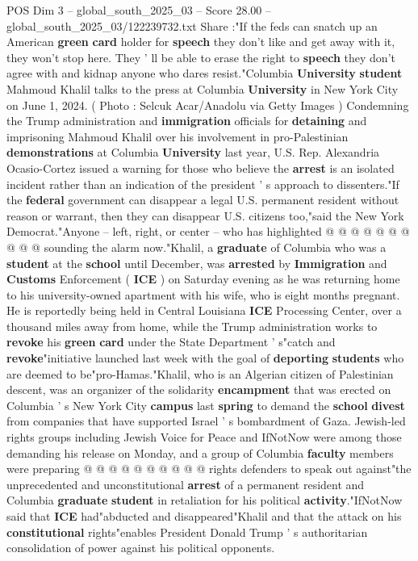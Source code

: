 \begin{textsample}{POS Dim 3 – global\_south\_2025\_03 – Score 28.00 – global\_south\_2025\_03/122239732.txt}  \label{ex:f3_pos_038}
Share :"If the feds can snatch up an American \textbf{green} \textbf{card} holder for \textbf{speech} they don't like and get away with it, they won't stop here.
They ' ll be able to erase the right to \textbf{speech} they don't agree with and kidnap anyone who dares resist."Columbia \textbf{University} \textbf{student} Mahmoud Khalil talks to the press at Columbia \textbf{University} in New York City on June 1, 2024. ( Photo : Selcuk Acar/Anadolu via Getty Images ) Condemning the Trump administration and \textbf{immigration} officials for \textbf{detaining} and imprisoning Mahmoud Khalil over his involvement in pro-Palestinian \textbf{demonstrations} at Columbia \textbf{University} last year, U.S.
Rep.
Alexandria Ocasio-Cortez issued a warning for those who believe the \textbf{arrest} is an isolated incident rather than an indication of the president ' s approach to dissenters."If the \textbf{federal} government can disappear a legal U.S. permanent resident without reason or warrant, then they can disappear U.S. citizens too,"said the New York Democrat."Anyone -- left, right, or center -- who has highlighted @ @ @ @ @ @ @ @ @ @ sounding the alarm now."Khalil, a \textbf{graduate} of Columbia who was a \textbf{student} at the \textbf{school} until December, was \textbf{arrested} by \textbf{Immigration} and \textbf{Customs} Enforcement ( \textbf{ICE} ) on Saturday evening as he was returning home to his university-owned apartment with his wife, who is eight months pregnant.
He is reportedly being held in Central Louisiana \textbf{ICE} Processing Center, over a thousand miles away from home, while the Trump administration works to \textbf{revoke} his \textbf{green} \textbf{card} under the State Department ' s"catch and \textbf{revoke}"initiative launched last week with the goal of \textbf{deporting} \textbf{students} who are deemed to be"pro-Hamas."Khalil, who is an Algerian citizen of Palestinian descent, was an organizer of the solidarity \textbf{encampment} that was erected on Columbia ' s New York City \textbf{campus} last \textbf{spring} to demand the \textbf{school} \textbf{divest} from companies that have supported Israel ' s bombardment of Gaza.
Jewish-led rights groups including Jewish Voice for Peace and IfNotNow were among those demanding his release on Monday, and a group of Columbia \textbf{faculty} members were preparing @ @ @ @ @ @ @ @ @ @ rights defenders to speak out against"the unprecedented and unconstitutional \textbf{arrest} of a permanent resident and Columbia \textbf{graduate} \textbf{student} in retaliation for his political \textbf{activity}."IfNotNow said that \textbf{ICE} had"abducted and disappeared"Khalil and that the attack on his \textbf{constitutional} rights"enables President Donald Trump ' s authoritarian consolidation of power against his political opponents.

\end{textsample}
